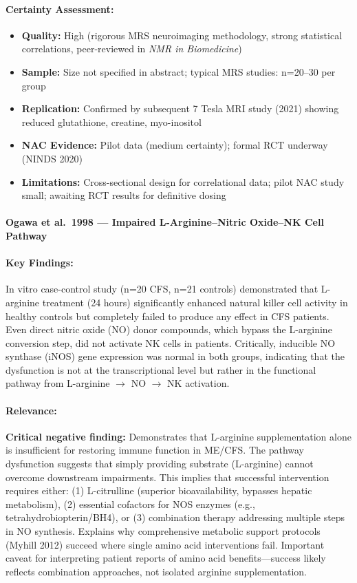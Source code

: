 \paragraph{Certainty Assessment:}
\begin{itemize}
    \item \textbf{Quality:} High (rigorous MRS neuroimaging methodology, strong statistical correlations, peer-reviewed in \emph{NMR in Biomedicine})
    \item \textbf{Sample:} Size not specified in abstract; typical MRS studies: n=20--30 per group
    \item \textbf{Replication:} Confirmed by subsequent 7 Tesla MRI study (2021) showing reduced glutathione, creatine, myo-inositol
    \item \textbf{NAC Evidence:} Pilot data (medium certainty); formal RCT underway (NINDS 2020)
    \item \textbf{Limitations:} Cross-sectional design for correlational data; pilot NAC study small; awaiting RCT results for definitive dosing
\end{itemize}

\paragraph{Ogawa et al.\ 1998 --- Impaired L-Arginine--Nitric Oxide--NK Cell Pathway}

\cite{Ogawa1998arginine_nk}

\paragraph{Key Findings:}
In vitro case-control study (n=20 CFS, n=21 controls) demonstrated that L-arginine treatment (24 hours) significantly enhanced natural killer cell activity in healthy controls but completely failed to produce any effect in CFS patients. Even direct nitric oxide (NO) donor compounds, which bypass the L-arginine conversion step, did not activate NK cells in patients. Critically, inducible NO synthase (iNOS) gene expression was normal in both groups, indicating that the dysfunction is not at the transcriptional level but rather in the functional pathway from L-arginine $\to$ NO $\to$ NK activation.

\paragraph{Relevance:}
\textbf{Critical negative finding:} Demonstrates that L-arginine supplementation alone is insufficient for restoring immune function in ME/CFS. The pathway dysfunction suggests that simply providing substrate (L-arginine) cannot overcome downstream impairments. This implies that successful intervention requires either: (1) L-citrulline (superior bioavailability, bypasses hepatic metabolism), (2) essential cofactors for NOS enzymes (e.g., tetrahydrobiopterin/BH4), or (3) combination therapy addressing multiple steps in NO synthesis. Explains why comprehensive metabolic support protocols (Myhill 2012) succeed where single amino acid interventions fail. Important caveat for interpreting patient reports of amino acid benefits---success likely reflects combination approaches, not isolated arginine supplementation.

